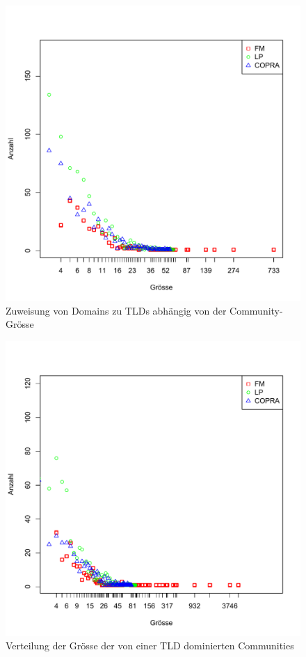 \begin{figure}[h]
  \centering
  \includegraphics[scale=0.8]{images/tld_sure_dist.pdf}
  \caption{Zuweisung von Domains zu TLDs abh\"angig von der Community-Gr\"osse}
  \label{fig:tld-sure-ass-dist}
\end{figure}


\begin{figure}[h]
  \centering
  \includegraphics[scale=0.8]{images/tld_maybe_dist.pdf}
  \caption{Verteilung der Gr\"osse der von einer TLD dominierten Communities}
  \label{fig:tld-maybe-ass-dist}
\end{figure}

